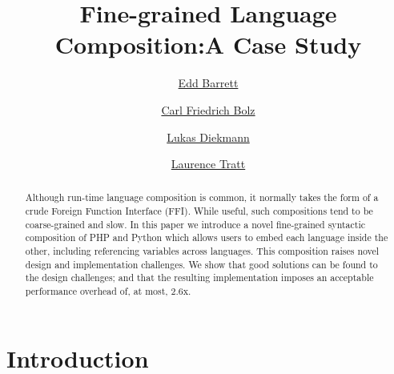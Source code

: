 \documentclass[a4paper,UKenglish]{lipics-v2016}
\begin{document}
\title{Fine-grained Language Composition:\newline A Case Study}
\author{\href{http://eddbarret.co.uk/}{Edd Barrett}}
\author{\href{http://cfbolz.de/}{Carl Friedrich Bolz}}
\author{\href{http://lukasdiekmann.com/}{Lukas Diekmann}}
\author{\href{http://tratt.net/laurie/}{Laurence Tratt}}



\maketitle





\begin{abstract}
Although run-time language composition is common, it normally takes the form of
a crude Foreign Function Interface (FFI). While useful, such compositions
tend to be coarse-grained and slow. In this paper we introduce a novel fine-grained
syntactic composition of PHP and Python which allows users to embed each
language inside the other, including referencing variables across languages.
This composition raises novel design and implementation challenges. We show
that good solutions can be found to the design challenges; and that the
resulting implementation imposes an acceptable
performance overhead of, at most, 2.6x.
\end{abstract}

\section{Introduction}
\label{sec:intro}
\end{document}
